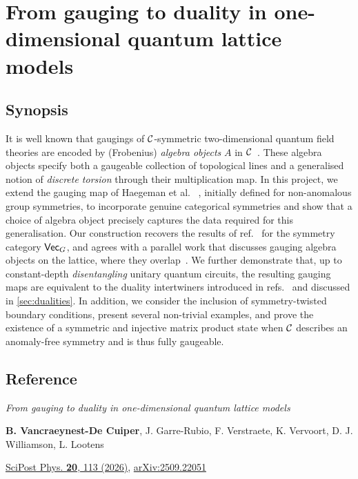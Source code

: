 \chapter{From gauging to duality in one-dimensional	quantum lattice models}\label{app:gauging}

\section{Synopsis}
It is well known that gaugings of $\mathcal{C}$-symmetric two-dimensional quantum field theories are encoded by (Frobenius) \emph{algebra objects} $A$ in $\mathcal{C}$~\cite{Fuchs2002,Bhardwaj2017}. These algebra objects specify both a gaugeable collection of topological lines and a generalised notion of \emph{discrete torsion} through their multiplication map. In this project, we extend the gauging map of Haegeman et al. ~\cite{Haegeman2014a}, initially defined for non-anomalous group symmetries, to incorporate genuine categorical symmetries and show that a choice of algebra object precisely captures the data required for this generalisation. Our construction recovers the results of ref.~\cite{Haegeman2014a} for the symmetry category $\mathsf{Vec}_G$, and agrees with a parallel work that discusses gauging algebra objects on the lattice, where they overlap~\cite{Seifnashri2025}. We further demonstrate that, up to constant-depth \emph{disentangling} unitary quantum circuits, the resulting gauging maps are equivalent to the duality intertwiners introduced in refs.~\cite{Lootens2021b,Lootens2022} and discussed in \cref{sec:dualities}. In addition, we consider the inclusion of symmetry-twisted boundary conditions, present several non-trivial examples, and prove the existence of a symmetric and injective matrix product state when $\mathcal{C}$ describes an anomaly-free symmetry and is thus fully gaugeable.
\newpage
\section{Reference}
\textit{From gauging to duality in one-dimensional	quantum lattice models} \par\noindent
\textbf{B. Vancraeynest-De Cuiper}, J. Garre-Rubio, F. Verstraete, K. Vervoort, D. J. Williamson, L. Lootens \par\noindent
\href{https:/doi.org/10.21468/SciPostPhys.20.4.113}{SciPost Phys. \textbf{20}, 113 (2026)}, \href{https://doi.org/10.48550/arXiv.2509.22051}{arXiv:2509.22051}
